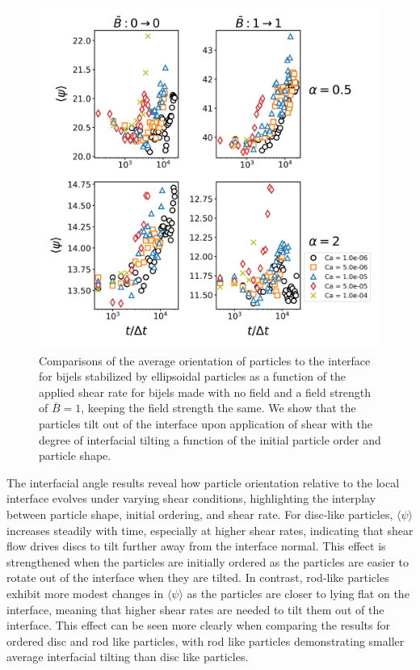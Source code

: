 \begin{figure} 
    \centering 
    \includegraphics[scale=0.3]{../figures/results/paper3/psi-time_compare-specific.png} 
    \caption{Comparisons of the average orientation of particles to the interface for bijels stabilized by
             ellipsoidal particles as a function of the applied shear rate for bijels made with no field and a field strength of $\bar{B} = 1$,
             keeping the field strength the same. We show that the particles tilt out of the interface upon application of shear with the degree of
             interfacial tilting a function of the initial particle order and particle shape.} 
    \label{fig:interface_angle_shear} 
\end{figure}

The interfacial angle results reveal how particle orientation relative to the local interface evolves under varying shear conditions, highlighting the interplay between particle shape, 
initial ordering, and shear rate. For disc-like particles, $\langle \psi \rangle$ increases steadily with time, especially at higher shear rates, indicating that shear 
flow drives discs to tilt further away from the interface normal. This effect is strengthened when the particles are initially ordered as the particles are easier to rotate out of the
interface when they are tilted. In contrast, rod-like particles exhibit more modest changes in $\langle \psi \rangle$ as the particles are closer to lying flat on the interface, meaning
that higher shear rates are needed to tilt them out of the interface. This effect can be seen more clearly when comparing the results for ordered disc and rod like particles, with
rod like particles demonstrating smaller average interfacial tilting than disc like particles.  

